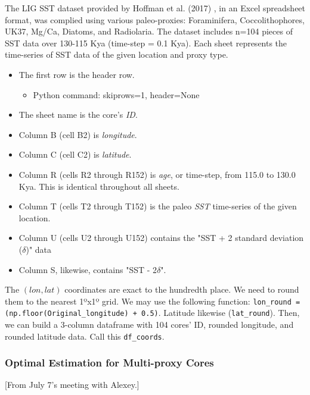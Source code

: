 \documentclass{article}
\begin{document}
The LIG SST dataset provided by Hoffman et al. (2017) \cite{Hoffman2017}, in an Excel spreadsheet format, was complied using various paleo-proxies: Foraminifera, Coccolithophores, UK37, Mg/Ca, Diatoms, and Radiolaria. The dataset includes n=104 pieces of SST data over 130-115 Kya (time-step = 0.1 Kya).
Each sheet represents the time-series of SST data of the given location and proxy type.
\begin{itemize}
    \item The first row is the header row.
    \begin{itemize}
        \item Python command: skiprows=1, header=None
    \end{itemize}
    \item The sheet name is the core's \textit{ID}.
    \item Column B (cell B2) is \textit{longitude}.
    \item Column C (cell C2) is \textit{latitude}.
    \item Column R (cells R2 through R152) is \textit{age}, or time-step, from 115.0 to 130.0 Kya. This is identical throughout all sheets.
    \item Column T (cells T2 through T152) is the paleo \textit{SST} time-series of the given location.
    \item Column U (cells U2 through U152) contains the "SST + 2 standard deviation ($\delta$)" data
    \item Column S, likewise, contains "SST - 2$\delta$".
\end{itemize}
The $(lon,lat)$ coordinates are exact to the hundredth place. We need to round them to the nearest 1ºx1º grid.
We may use the following function:
\texttt{lon\_round = (np.floor(Original\_longitude) + 0.5)}. 
Latitude likewise (\texttt{lat\_round}).
Then, we can build a 3-column dataframe with 104 cores' ID, rounded longitude, and rounded latitude data. Call this \texttt{df\_coords}.

\subsubsection{Optimal Estimation for Multi-proxy Cores}
\color{purple} [From July 7's meeting with Alexey.] \color{black}

\end{document}
